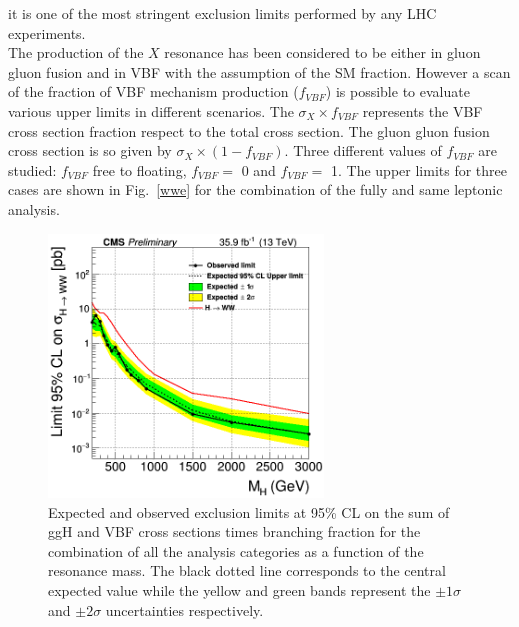it is one of the most stringent exclusion limits performed by any LHC experiments.\\
\newline
The production of the $X$ resonance has been considered to be either in gluon gluon fusion and in VBF with the assumption of the SM fraction. 
However a scan of the fraction of VBF mechanism production ($f_{VBF}$) is possible to evaluate various upper limits in different scenarios. 
The $\sigma_X \times f_{VBF}$ represents the VBF  cross section  fraction respect to the total cross section. 
The gluon gluon fusion cross section is so  given by $\sigma_X \times ( 1-  f_{VBF} )$. 
Three different values of  $f_{VBF}$ are studied:   $f_{VBF}$ free to floating, $f_{VBF}=$ 0 and $f_{VBF}=$ 1. 
The upper limits for three cases are shown in Fig.~\ref{wwe}  for the combination of the fully and same leptonic analysis.
\begin{figure}[H]
\centering
\includegraphics[width=0.65\textwidth]{../Cap6/all}
\caption{Expected and observed exclusion limits at 95\% CL on the sum of ggH and VBF cross
sections times branching fraction for the combination of all the analysis categories as a function
of the resonance mass. The black dotted line corresponds to the central expected value while
the yellow and green bands represent the $\pm 1 \sigma$ and $\pm 2 \sigma$ uncertainties respectively.}
\label{lim_superC}
\end{figure}
